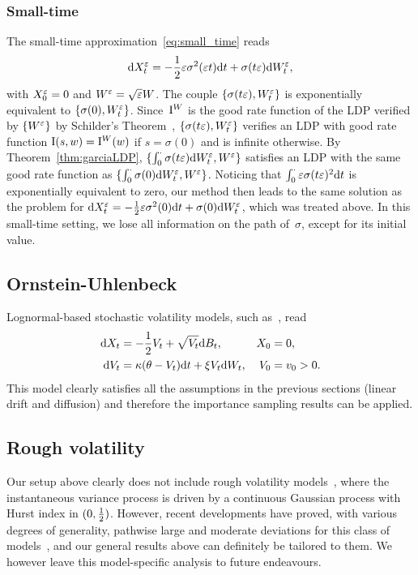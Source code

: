 \subsubsection{Small-time}
The small-time approximation~\eqref{eq:small_time} reads
$$\mathrm{d} X_t^{\varepsilon} = -\frac{1}{2}\varepsilon\sigma^2(\varepsilon t)\mathrm{d} t + \sigma(t\varepsilon) \mathrm{d} W_t^{\varepsilon},$$
with $X_0 ^{\varepsilon} = 0$ and $W^{\varepsilon} = \sqrt{\varepsilon}W$.
The couple $\{\sigma(t\varepsilon), W_t^\varepsilon\}$ is exponentially equivalent to $\{\sigma(0),W_t^\varepsilon\}$. 
Since~$\mathrm{I}^{W}$ is the good rate function of the LDP verified by $\{W^\varepsilon\}$ by Schilder's Theorem~\cite[Theorem 5.2.3]{Dembo2010LargeApplications}, $\{\sigma(t\varepsilon), W_t^\varepsilon\}$ verifies an LDP with good rate function
$\mathrm{I}(s,w) = \mathrm{I}^{W}(w)$
if $s = \sigma(0)$ and is infinite otherwise.
By Theorem~\ref{thm:garciaLDP}, $\{\int_0^\cdot\sigma(t\varepsilon)\mathrm{d} W_t^\varepsilon,W^\varepsilon\}$ satisfies an LDP with the same good rate function as $\{\int_0^\cdot\sigma(0)\mathrm{d} W_t^\varepsilon,W^\varepsilon\}$. 
Noticing that  $\int_0^\cdot \varepsilon \sigma(t\varepsilon)^2\mathrm{d} t$ is exponentially equivalent to zero, our method then leads to the same solution as the problem for 
$\mathrm{d} X_t^{\varepsilon} = -\frac{1}{2}\varepsilon\sigma^2(0)\mathrm{d} t + \sigma(0) \mathrm{d} W_t^{\varepsilon}$,
which was treated above. 
In this small-time setting, we lose all information on the path of~$\sigma$, except for its initial value.



\subsection{Ornstein-Uhlenbeck}\label{sec:OU}
Lognormal-based stochastic volatility models, 
such as~\cite{Sepp2012BetaModel}, read
\begin{equation}\label{eq:LogNormalVol}
\begin{aligned}
    \mathrm{d} X_t &= -\frac12 V_t + \sqrt{V_t}\mathrm{d} B_t, & X_0 &= 0,\\
    \mathrm{d} V_t &= \kappa (\theta - V_t)\mathrm{d} t + \xi V_t\mathrm{d} W_t, & V_0 &= v_0 > 0.
\end{aligned}
\end{equation}
This model clearly satisfies all the assumptions in the previous sections (linear drift and diffusion)
and therefore the importance sampling results can be applied.

\subsection{Rough volatility}\label{sec:RoughVol}
Our setup above clearly does not include rough volatility models~\cite{Gatheral2018VolatilityRough}, where the instantaneous variance process is driven by a continuous Gaussian process with Hurst index in $(0,\frac{1}{2})$.
However, recent developments have proved, with various degrees of generality,
pathwise large and moderate deviations for this class of models~\cite{Gerhold2021PathwiseCorrigendum, Gulisashvili2018LargeModels, Gulisashvili2021Time-inhomogeneousRoughness, Jacquier2018PathwiseModel, Jacquier2022LargeSystems},
and our general results above can definitely be tailored to them.
We however leave this model-specific analysis to future endeavours.

